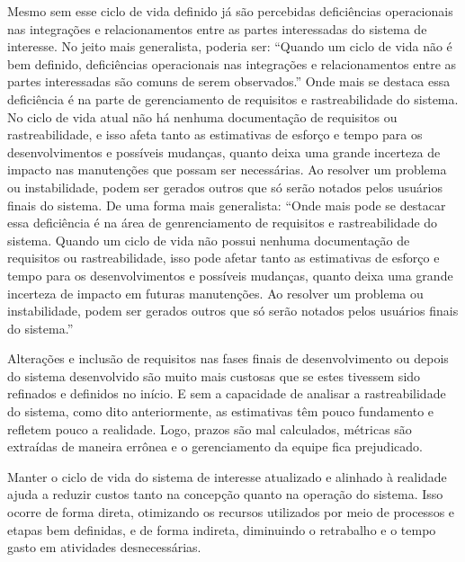 	Mesmo sem esse ciclo de vida definido já são percebidas deficiências operacionais 
	nas integrações e relacionamentos entre as partes interessadas do sistema de 
	interesse. {\color{red} No jeito mais generalista, poderia ser: ``Quando um ciclo de vida não é bem definido, deficiências operacionais nas integrações e relacionamentos entre as partes interessadas são comuns de serem observados.''} Onde mais se destaca essa deficiência é na parte de 
	gerenciamento de requisitos e rastreabilidade do sistema. No ciclo de vida atual 
	não há nenhuma documentação de requisitos ou rastreabilidade, e isso afeta tanto 
	as estimativas de esforço e tempo para os desenvolvimentos e possíveis mudanças, 
	quanto deixa uma grande incerteza de impacto nas manutenções que possam ser 
	necessárias. Ao resolver um problema ou instabilidade, podem ser gerados outros 
	que só serão notados pelos usuários finais do sistema. {\color{red} De uma forma mais generalista: ``Onde mais pode se destacar essa deficiência é na área de genrenciamento de requisitos e rastreabilidade do sistema. Quando um ciclo de vida não possui nenhuma documentação de requisitos ou rastreabilidade, isso pode afetar tanto as estimativas de esforço e tempo para os desenvolvimentos e possíveis mudanças, quanto deixa uma grande incerteza de impacto em futuras manutenções. Ao resolver um problema ou instabilidade, podem ser gerados outros que só serão notados pelos usuários finais do sistema.''}

	Alterações e inclusão de requisitos nas fases finais de desenvolvimento ou depois 
	do sistema desenvolvido são muito mais custosas que se estes tivessem sido 
	refinados e definidos no início. E sem a capacidade de analisar a rastreabilidade do 
	sistema, como dito anteriormente, as estimativas têm pouco fundamento e 
	refletem pouco a realidade. Logo, prazos são mal calculados, métricas são extraídas 
	de maneira errônea e o gerenciamento da equipe fica prejudicado. 

	Manter o ciclo de vida do sistema de interesse atualizado e alinhado à realidade ajuda a reduzir custos tanto na concepção quanto na operação do sistema. Isso ocorre de forma direta, otimizando os recursos utilizados por meio de processos e etapas bem definidas, e de forma indireta, diminuindo o retrabalho e o tempo gasto em atividades desnecessárias.

